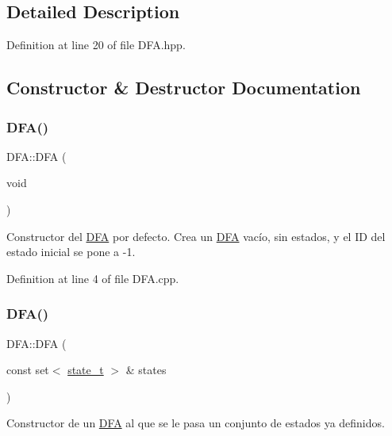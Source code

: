 \subsection{Detailed Description}


Definition at line 20 of file D\+F\+A.\+hpp.



\subsection{Constructor \& Destructor Documentation}
\mbox{\label{class_d_f_a_a22147c876a89b6342512b13b20dd5fcd}} 
\subsubsection{\texorpdfstring{D\+F\+A()}{DFA()}\hspace{0.1cm}{\footnotesize\ttfamily [1/2]}}
{\footnotesize\ttfamily D\+F\+A\+::\+D\+FA (\begin{DoxyParamCaption}\item[{void}]{ }\end{DoxyParamCaption})}



Constructor del \hyperlink{class_d_f_a}{D\+FA} por defecto. Crea un \hyperlink{class_d_f_a}{D\+FA} vacío, sin estados, y el ID del estado inicial se pone a -\/1. 



Definition at line 4 of file D\+F\+A.\+cpp.

\mbox{\label{class_d_f_a_a58748588a492bf8c3f5dd9bb1310aa41}} 
\subsubsection{\texorpdfstring{D\+F\+A()}{DFA()}\hspace{0.1cm}{\footnotesize\ttfamily [2/2]}}
{\footnotesize\ttfamily D\+F\+A\+::\+D\+FA (\begin{DoxyParamCaption}\item[{const set$<$ \hyperlink{classstate__t}{state\+\_\+t} $>$ \&}]{states }\end{DoxyParamCaption})}



Constructor de un \hyperlink{class_d_f_a}{D\+FA} al que se le pasa un conjunto de estados ya definidos. 


